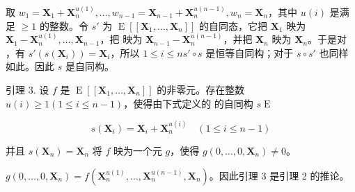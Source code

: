 取 \(w_1 = \mathbf{X}_1 + \mathbf{X}_n^{u(1)}, \ldots, w_{n-1} = \mathbf{X}_{n-1} + \mathbf{X}_n^{u(n-1)}, w_n = \mathbf{X}_n\)，其中 \(u(i)\) 是满足 \(\geqslant 1\) 的整数。令 \(s'\) 为 \(\operatorname{E}[[\mathbf{X}_1, \ldots, \mathbf{X}_n]]\) 的自同态，它把 \(\mathbf{X}_1\) 映为 \(\mathbf{X}_1 - \mathbf{X}_n^{u(1)}, \ldots, \mathbf{X}_{n-1}\)，把  映为 \(\mathbf{X}_{n-1} - \mathbf{X}_n^{u(n-1)}\)，并把 \(\mathbf{X}_n\) 映为 \(\mathbf{X}_n\)。于是对 ，有 \(s'(s(\mathbf{X}_i)) = \mathbf{X}_i\)，所以 \(1 \leqslant i \leqslant n\)\(s' \circ s\) 是恒等自同构；对于 \(s \circ s'\) 也同样如此。因此 \(s\) 是自同构。

引理 3. 设 \(f\) 是 \(\operatorname{E}[[\mathbf{X}_1, \ldots, \mathbf{X}_n]]\) 的非零元。存在整数 \(u(i) \geqslant 1 (1 \leqslant i \leqslant n - 1)\)，使得由下式定义的  的自同构 \(s\)\(\operatorname{E}\)

\[
s (\mathbf {X} _ {i}) = \mathbf {X} _ {i} + \mathbf {X} _ {n} ^ {u (i)} \quad (1 \leqslant i \leqslant n - 1)
\]

并且 \(s(\mathbf{X}_n) = \mathbf{X}_n\) 将 \(f\) 映为一个元 \(g\)，使得 \(g(0, \ldots, 0, \mathbf{X}_n) \neq 0\)。

\(g(0,\ldots,0,\mathbf{X}_n) = f(\mathbf{X}_n^{u(1)},\ldots ,\mathbf{X}_n^{u(n - 1)},\mathbf{X}_n)\)。因此引理 3 是引理 2 的推论。

